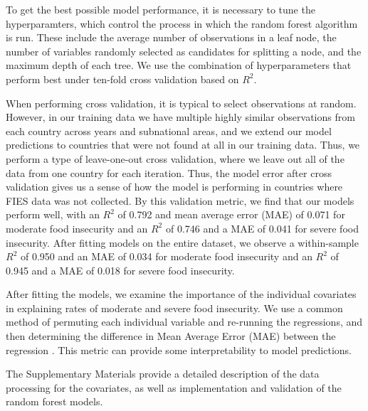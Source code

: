 \documentclass{article}
\begin{document}
To get the best possible model performance, it is necessary to tune the hyperparamters, which control the process in which the random forest algorithm is run.  These include the average number of observations in a leaf node, the number of variables randomly selected as candidates for splitting a node, and the maximum depth of each tree.  We use the combination of hyperparameters that perform best under ten-fold cross validation based on $R^2$.

When performing cross validation, it is typical to select observations at random.  However, in our training data we have multiple highly similar observations from each country across years and subnational areas, and we extend our model predictions to countries that were not found at all in our training data.  Thus, we perform a type of leave-one-out cross validation, where we leave out all of the data from one country for each iteration.  Thus, the model error after cross validation gives us a sense of how the model is performing in countries where FIES data was not collected.  By this validation metric, we find that our models perform well, with an $R^2$ of 0.792 and mean average error (MAE) of 0.071 for moderate food insecurity and an $R^2$ of 0.746 and a MAE of 0.041 for severe food insecurity.  After fitting models on the entire dataset, we observe a within-sample $R^2$ of 0.950 and an MAE of 0.034 for moderate food insecurity and an $R^2$ of 0.945 and a MAE of 0.018 for severe food insecurity.

After fitting the models, we examine the importance of the individual covariates in explaining rates of moderate and severe food insecurity. We use a common method of permuting each individual variable and re-running the regressions, and then determining the difference in Mean Average Error (MAE) between the regression \citep{ishwaran2007variable, breiman2001random}.  This metric can provide some interpretability to model predictions.

The Supplementary Materials provide a detailed description of the data processing for the covariates, as well as implementation and validation of the random forest models.

\printbibliography
\end{document}
